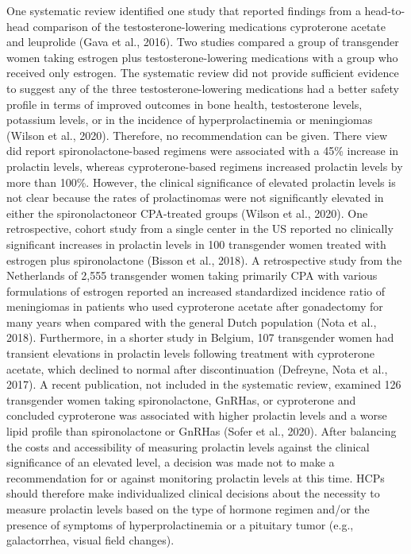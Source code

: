 \documentclass[
]{book}
\begin{document}
One systematic review identified one study that
reported findings from a head-to-head comparison of the testosterone-lowering medications
cyproterone acetate and leuprolide (Gava et al.,
2016). Two studies compared a group of transgender women taking estrogen plus
testosterone-lowering medications with a group
who received only estrogen. The systematic
review did not provide sufficient evidence to suggest any of the three testosterone-lowering medications had a better safety profile in terms of
improved outcomes in bone health, testosterone
levels, potassium levels, or in the incidence of
hyperprolactinemia or meningiomas (Wilson
et al., 2020). Therefore, no recommendation can
be given. There view did report
spironolactone-based regimens were associated
with a 45\% increase in prolactin levels, whereas
cyproterone-based regimens increased prolactin
levels by more than 100\%. However, the clinical
significance of elevated prolactin levels is not
clear because the rates of prolactinomas were not
significantly elevated in either the spironolactoneor CPA-treated groups (Wilson et al., 2020). One
retrospective, cohort study from a single center
in the US reported no clinically significant
increases in prolactin levels in 100 transgender
women treated with estrogen plus spironolactone
(Bisson et al., 2018). A retrospective study from
the Netherlands of 2,555 transgender women taking primarily CPA with various formulations of
estrogen reported an increased standardized incidence ratio of meningiomas in patients who used
cyproterone acetate after gonadectomy for many
years when compared with the general Dutch
population (Nota et al., 2018). Furthermore, in
a shorter study in Belgium, 107 transgender
women had transient elevations in prolactin levels
following treatment with cyproterone acetate,
which declined to normal after discontinuation
(Defreyne, Nota et al., 2017). A recent publication, not included in the systematic review, examined 126 transgender women taking spironolactone,
GnRHas, or cyproterone and concluded cyproterone was associated with higher prolactin levels
and a worse lipid profile than spironolactone or
GnRHas (Sofer et al., 2020). After balancing the
costs and accessibility of measuring prolactin levels against the clinical significance of an elevated
level, a decision was made not to make a recommendation for or against monitoring prolactin
levels at this time. HCPs should therefore make
individualized clinical decisions about the necessity to measure prolactin levels based on the type
of hormone regimen and/or the presence of
symptoms of hyperprolactinemia or a pituitary
tumor (e.g., galactorrhea, visual field changes).
\end{document}
